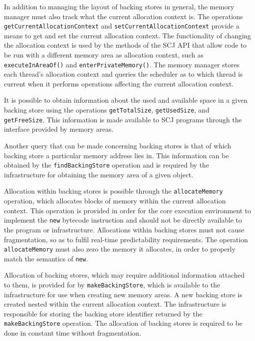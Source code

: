 \documentclass[a4paper,10pt]{report}
\begin{document}
In addition to managing the layout of backing stores in general, the
memory manager must also track what the current allocation context is.
The operations \texttt{get\-Cur\-rent\-Allo\-cation\-Con\-text} and
\texttt{set\-Cur\-rent\-Allo\-cation\-Con\-text} provide a means to
get and set the current allocation context.
The functionality of changing the allocation context is used by the
methods of the SCJ API that allow code to be run with a different
memory area as allocation context, such as
\texttt{execute\-In\-Area\-Of()} and
\texttt{enter\-Private\-Memory()}.
The memory manager stores each thread's allocation context and queries
the scheduler as to which thread is current when it performs
operations affecting the current allocation context.

It is possible to obtain information about the used and available
space in a given backing store using the operations
\texttt{get\-Total\-Size}, \texttt{get\-Used\-Size}, and
\texttt{get\-Free\-Size}.
This information is made available to SCJ programs through the
interface provided by memory areas.

Another query that can be made concerning backing stores is that of
which backing store a particular memory address lies in.
This information can be obtained by the \texttt{find\-Backing\-Store}
operation and is required by the infrastructure for obtaining the
memory area of a given object.

Allocation within backing stores is possible through the
\texttt{allo\-cate\-Memory} operation, which allocates blocks of
memory within the current allocation context.
This operation is provided in order for the core execution environment
to implement the \texttt{new} bytecode instruction and should not be
directly available to the program or infrastructure.
Allocations within backing stores must not cause fragmentation, so as
to fulfil real-time predictability requirements.
The operation \texttt{allo\-cate\-Memory} must also zero the memory it
allocates, in order to properly match the semantics of \texttt{new}.
 
Allocation of backing stores, which may require additional information
attached to them, is provided for by \texttt{make\-Back\-ing\-Store},
which is available to the infrastructure for use when creating new
memory areas.
A new backing store is created nested within the current allocation
context.
The infrastructure is responsible for storing the backing store
identifier returned by the \texttt{make\-Backing\-Store} operation.
The allocation of backing stores is required to be done in constant
time without fragmentation.
\end{document}
